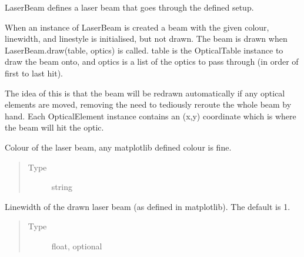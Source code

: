 \documentclass[letterpaper,10pt,english]{sphinxmanual}
\begin{document}
\begin{fulllineitems}
\label{\detokenize{index:pyopticaltable.LaserBeam}}
\sphinxAtStartPar
LaserBeam defines a laser beam that goes through the defined setup.

\sphinxAtStartPar
When an instance of LaserBeam is created a beam with the given colour,
linewidth, and linestyle is initialised, but not drawn. The beam is drawn
when LaserBeam.draw(table, optics) is called. table is the OpticalTable instance
to draw the beam onto, and optics is a list of the optics to pass through
(in order of first to last hit).

\sphinxAtStartPar
The idea of this is that the beam will be redrawn automatically if any optical
elements are moved, removing the need to tediously reroute the whole beam by hand.
Each OpticalElement instance contains an (x,y) coordinate which is where the beam will hit the optic.

\begin{fulllineitems}
\label{\detokenize{index:pyopticaltable.LaserBeam.colour}}
\sphinxAtStartPar
Colour of the laser beam, any matplotlib defined colour is fine.
\begin{quote}\begin{description}
\item[{Type}] \leavevmode
\sphinxAtStartPar
string

\end{description}\end{quote}

\end{fulllineitems}


\begin{fulllineitems}
\label{\detokenize{index:pyopticaltable.LaserBeam.width}}
\sphinxAtStartPar
Linewidth of the drawn laser beam (as defined in matplotlib).
The default is 1.
\begin{quote}\begin{description}
\item[{Type}] \leavevmode
\sphinxAtStartPar
float, optional


\end{description}
\end{quote}
\end{fulllineitems}
\end{fulllineitems}
\end{document}
